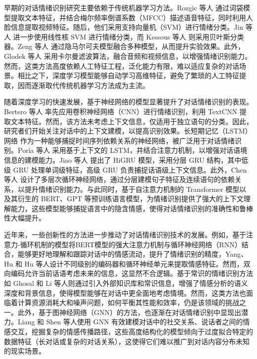 早期的对话情绪识别研究主要依赖于传统机器学习方法。Rozgic 等人\cite{Rozgic_Ananthakrishnan_Saleem_Kumar_Prasad_2012} 通过词袋模型提取文本特征，并结合梅尔频率倒谱系数（MFCC）描述语音特征，同时利用人脸信息提取视频特征。随后，他们采用支持向量机（SVM）进行情绪分类。Jin 等人\cite{Jin_Li_Chen_Wu_2015} 进一步使用线性核 SVM 进行情绪分类，而 Kessous 等人\cite{Kessous_Castellano_Caridakis_2010} 则采用贝叶斯分类器。Zeng 等人\cite{Zeng_Hu_Liu_Fu_Huang_2006} 通过隐马尔可夫模型融合多种模型，从而提升实验效果。此外，Glodek 等人\cite{Glodek_Reuter_Schels_Dietmayer_Schwenker_2013} 采用卡尔曼滤波算法，融合音频和视频信息，以增强情绪识别能力。然而，这类方法高度依赖人工特征工程，泛化能力有限，难以适应复杂的对话场景。相比之下，深度学习模型能够自动学习高维特征，避免了繁琐的人工特征提取，因而逐渐取代传统机器学习方法成为主流。

随着深度学习的快速发展，基于神经网络的模型显著提升了对话情绪识别的表现。Bertero 等人\cite{Bertero_Siddique_Wu_Wan_Chan_Fung_2016} 率先应用卷积神经网络（CNN）进行情绪识别，利用 TextCNN 提取文本特征。然而，该方法未考虑上下文信息，仅适用于独立语句的分类。因此，研究者们开始关注对话中的上下文建模，以提高识别效果。长短期记忆（LSTM）网络\cite{Hochreiter_Schmidhuber_1997} 作为一种能够捕捉时间序列依赖关系的神经网络，被广泛用于对话情绪识别。Poria 等人\cite{Poria_Cambria_Hazarika_Majumder_Zadeh_Morency_2017} 采用基于上下文的 LSTM，并结合注意力机制，以增强对话语境信息的建模能力。Jiao 等人\cite{Jiao_Yang_King_Lyu_2019} 提出了 HiGRU 模型，采用分层 GRU\cite{Cho_van_Merrienboer_Gulcehre_Bahdanau_Bougares_Schwenk_Bengio_2014} 结构，其中低级 GRU 处理单词级特征，高级 GRU 负责捕捉话语级上下文信息。此外，Chen 等人\cite{Chen_Hsu_Kuo_Ting-Hao_Huang_Ku_2018} 设计了多层次循环神经网络\cite{Elman_1990}，通过分层建模句子特征及连续语句的依赖关系，以提升情绪识别能力。与此同时，基于自注意力机制的 Transformer\cite{Vaswani_Shazeer_Parmar_Uszkoreit_Jones_Gomez_Kaiser_Polosukhin_2017} 模型以及其衍生的 BERT\cite{Devlin_Chang_Lee_Toutanova_2019}、GPT\cite{Radford_Narasimhan_Salimans_Sutskever} 等预训练语言模型，为情绪识别提供了强大的上下文理解能力，这些模型能够捕捉语言中的隐含情感，使得对话情绪识别的准确性和鲁棒性大幅提升。

近年来，一些创新性的方法进一步推动了对话情绪识别技术的发展。例如，基于注意力-循环机制的模型将BERT模型的强大注意力机制与循环神经网络（RNN）结合，能够更好地理解和跟踪对话中的情感流动，提升了情绪识别的精度，Yang\cite{yan_yang_yin_2023}、Hu\cite{Hu_Bao_Wei_Zhou_Hu_2023} 和 Hu\cite{Hu_Wei_Huai_2021} 等人设计不同级别的编码器和循环神经单元来提取情感特征。然而，双向编码允许当前话语考虑未来的信息，这显然不合逻辑。基于常识的情绪识别方法如 Ghosal\cite{Ghosal_Majumder_Gelbukh_Mihalcea_Poria_2020} 和 Li\cite{Li_Lin_Fu_Wang_2021} 等人则通过引入外部知识库和常识信息，增强了情感分析的语义深度和背景信息，使得模型能够在对话中更全面地考虑情境。然而，这类方法也面临着计算资源消耗大和噪声问题，如何平衡其性能和效率，仍是该领域的挑战之一。此外，基于图神经网络（GNN）的方法，也逐渐在对话情绪识别中显现出潜力。Liang\cite{Liang_Yang_Xu_Huang_Wang_Dong} 和 Shen\cite{Shen_Wu_Yang_Quan_2021} 等人使用 GNN 有效建模对话中的社交关系、说话者之间的情感交互，挖掘复杂的情感传播路径，这些高度结构化的模型倾向于过度拟合特定的数据特征（长对话或复杂的对话关系），这使得它们难以推广到对话内容分布未知的现实场景。

